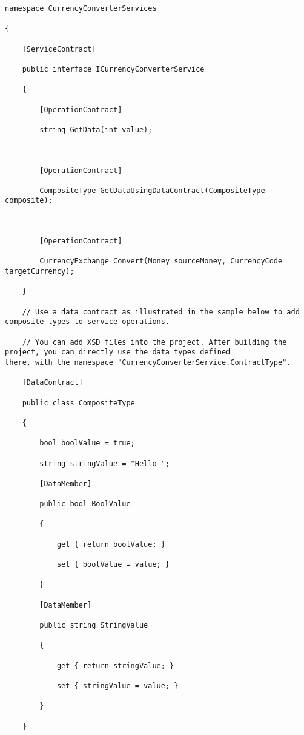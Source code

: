 \documentclass[a4paper,10pt]{scrreprt}
\begin{document}
\begin{lstlisting}[caption=wcf example]
 namespace CurrencyConverterServices

{

    [ServiceContract]

    public interface ICurrencyConverterService

    {

        [OperationContract]

        string GetData(int value);



        [OperationContract]

        CompositeType GetDataUsingDataContract(CompositeType composite);



        [OperationContract]

        CurrencyExchange Convert(Money sourceMoney, CurrencyCode targetCurrency);

    }

    // Use a data contract as illustrated in the sample below to add composite types to service operations.

    // You can add XSD files into the project. After building the project, you can directly use the data types defined 
there, with the namespace "CurrencyConverterService.ContractType".

    [DataContract]

    public class CompositeType

    {

        bool boolValue = true;

        string stringValue = "Hello ";

        [DataMember]

        public bool BoolValue

        {

            get { return boolValue; }

            set { boolValue = value; }

        }

        [DataMember]

        public string StringValue

        {

            get { return stringValue; }

            set { stringValue = value; }

        }

    }


\end{lstlisting}
\end{document}
